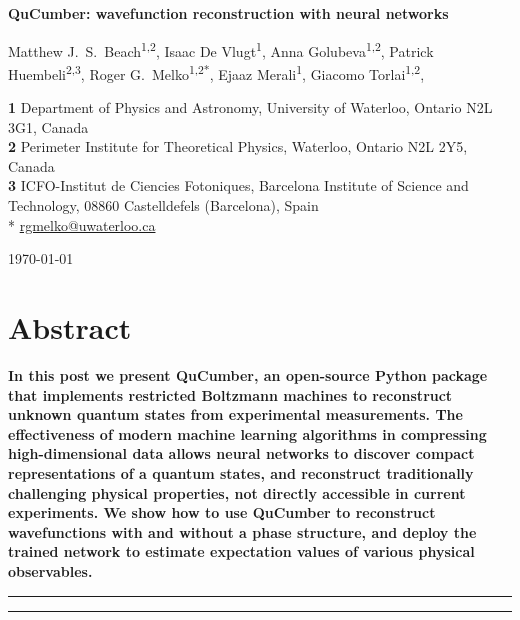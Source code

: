 \documentclass[submission, Phys, hidelinks]{SciPost}
\newcommand{\red}[1]{{\color{red} #1}}
\begin{document}
\begin{center}{\Large \textbf{
	QuCumber: wavefunction reconstruction with neural networks
}}\end{center}

\begin{center}
	Matthew J.~S.~Beach\textsuperscript{1,2},
	Isaac De Vlugt\textsuperscript{1},
	Anna Golubeva\textsuperscript{1,2},
	Patrick Huembeli\textsuperscript{2,3},
	Roger G.~Melko\textsuperscript{1,2*},
	Ejaaz Merali\textsuperscript{1},
	Giacomo Torlai\textsuperscript{1,2},
\end{center}

\begin{center}
	{\bf 1} 
	Department of Physics and Astronomy, University of Waterloo,
	Ontario N2L 3G1, Canada
	\\
	{\bf 2} Perimeter Institute for Theoretical Physics, Waterloo,
	Ontario N2L 2Y5, Canada
	\\
	{\bf 3} ICFO-Institut de Ciencies Fotoniques, Barcelona Institute of Science and Technology,
	08860 Castelldefels (Barcelona), Spain\\

	* \href{mailto:rgmelko@uwaterloo.ca}{rgmelko@uwaterloo.ca} \\
\end{center}

\begin{center}
	\today
\end{center}


\section*{Abstract}
{\bf
    \red{
		In this post we present QuCumber, an open-source Python package that implements restricted Boltzmann machines to reconstruct unknown quantum states from experimental measurements. The effectiveness of modern machine learning algorithms in compressing high-dimensional data allows neural networks to discover compact representations of a quantum states, and reconstruct traditionally challenging physical properties, not directly accessible in current experiments. We show how to use QuCumber to reconstruct wavefunctions with and without a phase structure, and deploy the trained network to estimate expectation values of various physical observables.
	}
}

\vspace{10pt}
\noindent\rule{\textwidth}{1pt}
\tableofcontents\thispagestyle{fancy}
\noindent\rule{\textwidth}{1pt}
\vspace{10pt}
\end{document}
